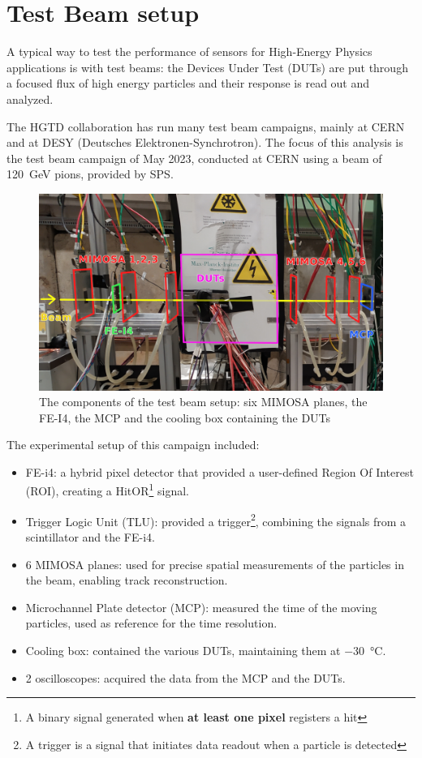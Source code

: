 \chapter{Test Beam setup}\label{chap:testbeam_setup}

A typical way to test the performance of sensors for High-Energy Physics applications is with test beams: the Devices Under Test (DUTs) are put through a focused flux of high energy particles and their response is read out and analyzed. %

The HGTD collaboration has run many test beam campaigns, mainly at CERN and at DESY (Deutsches Elektronen-Synchrotron). The focus of this analysis is the test beam campaign of May 2023, conducted at CERN using a beam of \qty{120}{\giga\electronvolt} pions, provided by SPS.

\begin{figure}[h!tbpt]
    \centering
    \includegraphics[width=.95\linewidth]{Images/TestBeam_setup/TestBeam_setup_redrawn.png}
    \captionsetup{width=\captionwidth}
    \caption{The components of the test beam setup: six MIMOSA planes, the FE-I4, the MCP and the cooling box containing the DUTs}
    \label{fig:testbeam_setup}
\end{figure}

The experimental setup of this campaign included:
\begin{itemize}
    \item FE-i4: a hybrid pixel detector that provided a user-defined Region Of Interest (ROI), creating a HitOR\footnote{A binary signal generated when \textbf{at least one pixel} registers a hit} signal. %
    \item Trigger Logic Unit (TLU): provided a trigger\footnote{A trigger is a signal that initiates data readout when a particle is detected}, combining the signals from a scintillator and the FE-i4. %
    \item 6 MIMOSA planes: used for precise spatial measurements of the particles in the beam, enabling track reconstruction.
    \item Microchannel Plate detector (MCP): measured the time of the moving particles, used as reference for the time resolution.
    \item Cooling box: contained the various DUTs, maintaining them at \qty{-30}{\degreeCelsius}.
    \item 2 oscilloscopes: acquired the data from the MCP and the DUTs. %
\end{itemize}

